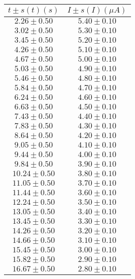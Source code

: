 \documentclass[12pt, letterpaper]{article} %
\theoremstyle{plain} %
\begin{document}
\vspace*{-2.5cm}
\begin{figure}[H]
\centering
\footnotesize
\begin{minipage}[t]{0.48\textwidth}
\centering
\begin{minipage}[t]{\linewidth}
\centering
\setlength{\arrayrulewidth}{1.2pt}
\begin{tabular}{|c|c|}
\hline
$t \pm s(t) (s)$ & $I \pm s(I) (\mu A)$ \\
\hline
$2.26 \pm 0.50$ & $5.40 \pm 0.10$ \\
$3.02 \pm 0.50$ & $5.30 \pm 0.10$ \\
$3.45 \pm 0.50$ & $5.20 \pm 0.10$ \\
$4.26 \pm 0.50$ & $5.10 \pm 0.10$ \\
$4.67 \pm 0.50$ & $5.00 \pm 0.10$ \\
$5.03 \pm 0.50$ & $4.90 \pm 0.10$ \\
$5.46 \pm 0.50$ & $4.80 \pm 0.10$ \\
$5.84 \pm 0.50$ & $4.70 \pm 0.10$ \\
$6.24 \pm 0.50$ & $4.60 \pm 0.10$ \\
$6.63 \pm 0.50$ & $4.50 \pm 0.10$ \\
$7.43 \pm 0.50$ & $4.40 \pm 0.10$ \\
$7.83 \pm 0.50$ & $4.30 \pm 0.10$ \\
$8.64 \pm 0.50$ & $4.20 \pm 0.10$ \\
$9.05 \pm 0.50$ & $4.10 \pm 0.10$ \\
$9.44 \pm 0.50$ & $4.00 \pm 0.10$ \\
$9.84 \pm 0.50$ & $3.90 \pm 0.10$ \\
$10.24 \pm 0.50$ & $3.80 \pm 0.10$ \\
$11.05 \pm 0.50$ & $3.70 \pm 0.10$ \\
$11.44 \pm 0.50$ & $3.60 \pm 0.10$ \\
$12.24 \pm 0.50$ & $3.50 \pm 0.10$ \\
$13.05 \pm 0.50$ & $3.40 \pm 0.10$ \\
$13.45 \pm 0.50$ & $3.30 \pm 0.10$ \\
$14.26 \pm 0.50$ & $3.20 \pm 0.10$ \\
$14.66 \pm 0.50$ & $3.10 \pm 0.10$ \\
$15.45 \pm 0.50$ & $3.00 \pm 0.10$ \\
$15.82 \pm 0.50$ & $2.90 \pm 0.10$ \\
$16.67 \pm 0.50$ & $2.80 \pm 0.10$ \\

\end{tabular}
\end{minipage}
\end{minipage}
\end{figure}
\end{document}
